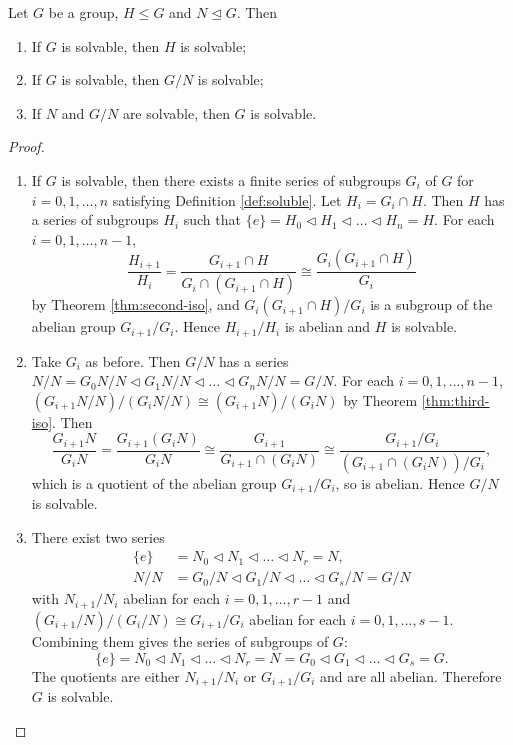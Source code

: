 \begin{theorem} \label{thm:soluble-main-appendix}
	Let $G$ be a group, $H \le G$ and $N \trianglelefteq G$. Then 
	\begin{enumerate}
		\item If $G$ is solvable, then $H$ is solvable;
		\item If $G$ is solvable, then $G / N$ is solvable; 
		\item If $N$ and $G / N$ are solvable, then $G$ is solvable. 
	\end{enumerate}
\end{theorem}
\begin{proof}
	\begin{enumerate}
		\item If $G$ is solvable, then there exists a finite series of subgroups $G_i$ of $G$ for $i = 0, 1, \dots, n$ satisfying Definition \ref{def:soluble}. Let $H_i = G_i \cap H$. Then $H$ has a series of subgroups $H_i$ such that $\{ e \} = H_0 \triangleleft H_1 \triangleleft \dots \triangleleft H_n = H.$
		For each $i = 0, 1, \dots, n - 1$, 
		$$
		\frac{H_{i+1}}{H_i} 
		= \frac{G_{i+1} \cap H}{G_i \cap (G_{i+1} \cap H)}
		\cong \frac{G_i(G_{i+1} \cap H)} {G_i}
		$$
		by Theorem \ref{thm:second-iso}, and ${G_i(G_{i+1} \cap H)}/{G_i}$ is a subgroup of the abelian group $G_{i+1} / G_{i}$. Hence $H_{i+1} / H_{i}$ is abelian and $H$ is solvable.
		\item Take $G_i$ as before. Then $G / N$ has a series
		$N/N = G_0 N / N \triangleleft G_1 N / N \triangleleft \dots \triangleleft G_n N / N  =  G / N. $
		For each $i = 0, 1, \dots, n - 1$, 
		$(G_{i+1} N / N) / (G_{i} N / N) \cong (G_{i+1} N) / (G_i N)$
		by Theorem \ref{thm:third-iso}. Then 
		$$
		\frac{G_{i+1} N}{G_i N} =\frac{G_{i+1}\left(G_i N\right)}{G_i N} \cong \frac{G_{i+1}}{G_{i+1} \cap\left(G_i N\right)} \cong \frac{G_{i+1} / G_i}{\left(G_{i+1} \cap\left(G_i N\right)\right) / G_i},
		$$
		which is a quotient of the abelian group $G_{i+1} / G_i$, so is abelian. Hence $G / N$ is solvable.
		\item There exist two series
		$$
		\begin{aligned}
			\{ e \} & =N_0 \triangleleft N_1 \triangleleft \ldots \triangleleft N_r=N, \\
			N / N & =G_0 / N \triangleleft G_1 / N \triangleleft \ldots \triangleleft G_s / N=G / N
		\end{aligned}
		$$
		with $N_{i+1} / N_{i}$ abelian for each $i = 0, 1, \dots, r-1$ and $(G_{i+1} / N)  / (G_{i} / N) \cong G_{i+1} / G_i $ abelian for each $i = 0,1, \dots, s-1$. Combining them gives the series of subgroups of $G$:
		$$
		\{ e \}=N_0 \triangleleft N_1 \triangleleft \ldots \triangleleft N_r=N=G_0 \triangleleft G_1 \triangleleft \ldots \triangleleft G_s=G .
		$$
		The quotients are either $N_{i+1} / N_i$  or $G_{i+1} / G_i$ and are all abelian. Therefore $G$ is solvable.
	\end{enumerate}
\end{proof}


